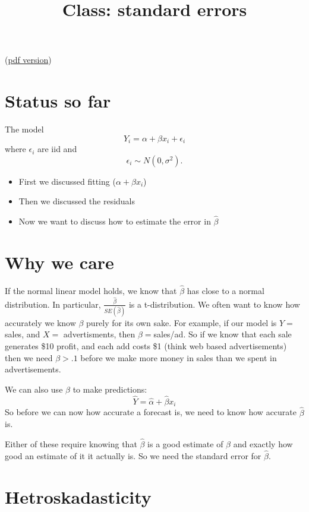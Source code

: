\documentclass{article}
\begin{document}
\title{Class: standard errors}

(\href{class_standard_errors.pdf}{pdf version})


\section{Status so far}

The model
\begin{displaymath}
Y_i = \alpha + \beta x_i + \epsilon_i 
\end{displaymath}
where $\epsilon_i$ are iid and
\begin{displaymath}
\epsilon_i \sim N(0,\sigma^2).
\end{displaymath}

\begin{itemize}
\item First we discussed fitting ($\alpha + \beta x_i$)
\item Then we discussed the residuals
\item Now we want to discuss how to estimate the error in $\hat\beta$
\end{itemize}

\section{Why we care}

If the normal linear model holds, we know that $\hat\beta$ has close
to a normal distribution.  In particular,
$\frac{\hat\beta}{SE(\hat\beta)}$ is a t-distribution.  We often want
to know how accurately we know $\beta$ purely for its own sake.  For
example, if our model is $Y = $ sales, and $X = $ advertisments, then
$\beta = $sales/ad.  So if we know that each sale generates \$10
profit, and each add costs \$1 (think web based advertisements) then
we need $\beta > .1$ before we make more money in sales than we spent
in advertisements.  

We can also use $\hat\beta$ to make predictions:
\begin{displaymath}
\hat{Y} = \hat\alpha + \hat\beta x_i
\end{displaymath}
 So before we can now how accurate a forecast is, we need to know how
accurate $\hat\beta$ is.

Either of these require knowing that $\hat\beta$ is a good estimate of
$\beta$ and exactly how good an estimate of it it actually is.  So we
need the standard error for $\hat\beta$.

\section{Hetroskadasticity}
\end{document}
